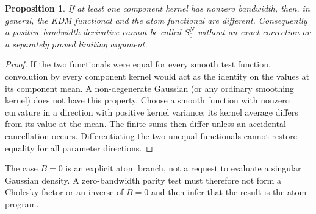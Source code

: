 \documentclass[11pt]{article}
\newtheorem{proposition}{Proposition}
\begin{document}
\begin{proposition}
If at least one component kernel has nonzero bandwidth, then, in general,
the KDM functional and the atom functional are different.  Consequently a
positive-bandwidth derivative cannot be called $S_0^N$ without an exact
correction or a separately proved limiting argument.
\end{proposition}

\begin{proof}
If the two functionals were equal for every smooth test function, convolution
by every component kernel would act as the identity on the values at its
component mean.  A non-degenerate Gaussian (or any ordinary smoothing
kernel) does not have this property.  Choose a smooth function with nonzero
curvature in a direction with positive kernel variance; its kernel average
differs from its value at the mean.  The finite sums then differ unless an
accidental cancellation occurs.  Differentiating the two unequal functionals
cannot restore equality for all parameter directions.
\end{proof}

The case $B=0$ is an explicit atom branch, not a request to evaluate a
singular Gaussian density.  A zero-bandwidth parity test must therefore not
form a Cholesky factor or an inverse of $B=0$ and then infer that the result is
the atom program.
\end{document}
